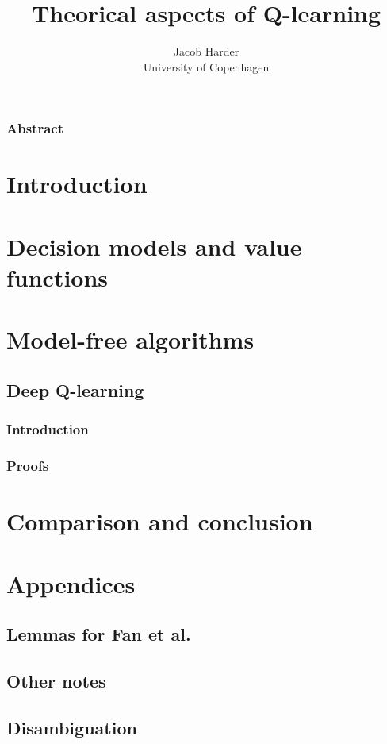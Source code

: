\documentclass{report}
\title{Theorical aspects of Q-learning}
\author{Jacob Harder \\ University of Copenhagen}
\begin{document}


\subsection*{Abstract}


\newpage
\renewcommand{\baselinestretch}{1.0}\normalsize
\tableofcontents
\renewcommand{\baselinestretch}{1.3}\normalsize

\newpage
\chapter{Introduction}

%
\chapter{Decision models and value functions}


\chapter{Model-free algorithms}


\section{Deep Q-learning}
\subsection{Introduction}

\subsection{Proofs}


\chapter{Comparison and conclusion}

\setcounter{chapter}{0}%
\renewcommand{\thechapter}{\Alph{chapter}}%
\chapter{Appendices}
\section{Lemmas for Fan et al.}

\section{Other notes}

\newpage
\section{Disambiguation}

\newpage
{}
\end{document}
